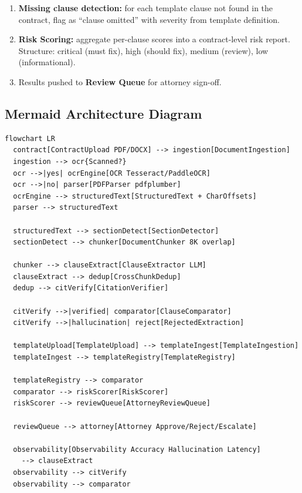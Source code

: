 \begin{enumerate}
\begin{itemize}
    \item Semantic similarity (sentence embedding cosine similarity).
    \item Clause-specific deviation rules (e.g., ``liability cap changed from \$5M to \$2M'' $\rightarrow$ critical deviation).
  \end{itemize}
  \item \textbf{Missing clause detection:} for each template clause not found in the contract, flag as ``clause omitted'' with severity from template definition.
  \item \textbf{Risk Scoring:} aggregate per-clause scores into a contract-level risk report. Structure: critical (must fix), high (should fix), medium (review), low (informational).
  \item Results pushed to \textbf{Review Queue} for attorney sign-off.
\end{enumerate}

\subsection*{Mermaid Architecture Diagram}

\begin{verbatim}
flowchart LR
  contract[ContractUpload PDF/DOCX] --> ingestion[DocumentIngestion]
  ingestion --> ocr{Scanned?}
  ocr -->|yes| ocrEngine[OCR Tesseract/PaddleOCR]
  ocr -->|no| parser[PDFParser pdfplumber]
  ocrEngine --> structuredText[StructuredText + CharOffsets]
  parser --> structuredText

  structuredText --> sectionDetect[SectionDetector]
  sectionDetect --> chunker[DocumentChunker 8K overlap]

  chunker --> clauseExtract[ClauseExtractor LLM]
  clauseExtract --> dedup[CrossChunkDedup]
  dedup --> citVerify[CitationVerifier]

  citVerify -->|verified| comparator[ClauseComparator]
  citVerify -->|hallucination| reject[RejectedExtraction]

  templateUpload[TemplateUpload] --> templateIngest[TemplateIngestion]
  templateIngest --> templateRegistry[TemplateRegistry]

  templateRegistry --> comparator
  comparator --> riskScorer[RiskScorer]
  riskScorer --> reviewQueue[AttorneyReviewQueue]

  reviewQueue --> attorney[Attorney Approve/Reject/Escalate]

  observability[Observability Accuracy Hallucination Latency]
    --> clauseExtract
  observability --> citVerify
  observability --> comparator
\end{verbatim}

